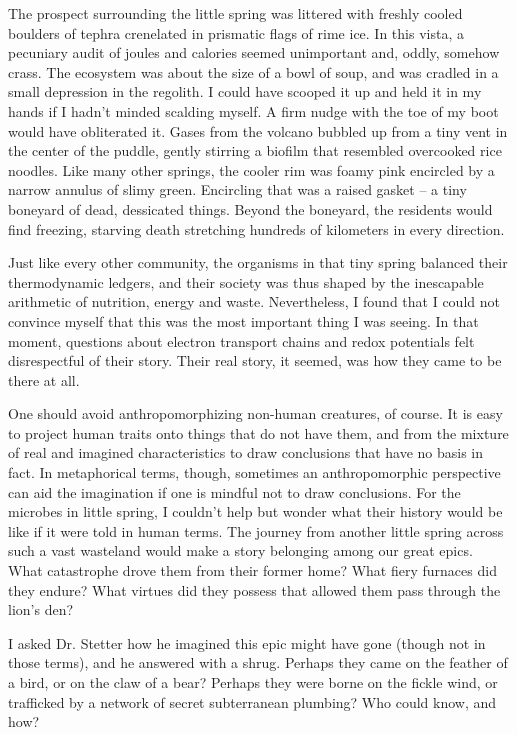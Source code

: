The prospect surrounding the little spring was littered with freshly cooled boulders of tephra crenelated in prismatic flags of rime ice. In this vista, a pecuniary audit of joules and calories seemed unimportant and, oddly, somehow crass. The ecosystem was about the size of a bowl of soup, and was cradled in a small depression in the regolith. I could have scooped it up and held it in my hands if I hadn't minded scalding myself. A firm nudge with the toe of my boot would have obliterated it. Gases from the volcano bubbled up from a tiny vent in the center of the puddle, gently stirring a biofilm that resembled overcooked rice noodles. Like many other springs, the cooler rim was foamy pink encircled by a narrow annulus of slimy green. Encircling that was a raised gasket -- a tiny boneyard of dead, dessicated things. Beyond the boneyard, the residents would find freezing, starving death stretching hundreds of kilometers in every direction. 

Just like every other community, the organisms in that tiny spring balanced their thermodynamic ledgers, and their society was thus shaped by the inescapable arithmetic of nutrition, energy and waste. Nevertheless, I found that I could not convince myself that this was the most important thing I was seeing. In that moment, questions about electron transport chains and redox potentials felt disrespectful of their story. Their real story, it seemed, was how they came to be there at all.

One should avoid anthropomorphizing non-human creatures, of course. It is easy to project human traits onto things that do not have them, and from the mixture of real and imagined characteristics to draw conclusions that have no basis in fact. In metaphorical terms, though, sometimes an anthropomorphic perspective can aid the imagination if one is mindful not to draw conclusions. For the microbes in little spring, I couldn't help but wonder what their history would be like if it were told in human terms. The journey from another little spring across such a vast wasteland would make a story belonging among our great epics. What catastrophe drove them from their former home? What fiery furnaces did they endure? What virtues did they possess that allowed them pass through the lion's den?

I asked Dr. Stetter how he imagined this epic might have gone (though not in those terms), and he answered with a shrug. Perhaps they came on the feather of a bird, or on the claw of a bear? Perhaps they were borne on the fickle wind, or trafficked by a network of secret subterranean plumbing? Who could know, and how?

